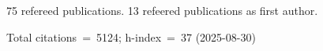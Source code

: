 75 refereed publications. 13 refeered publications as first author.

Total citations~=~5124; h-index~=~37 (2025-08-30)